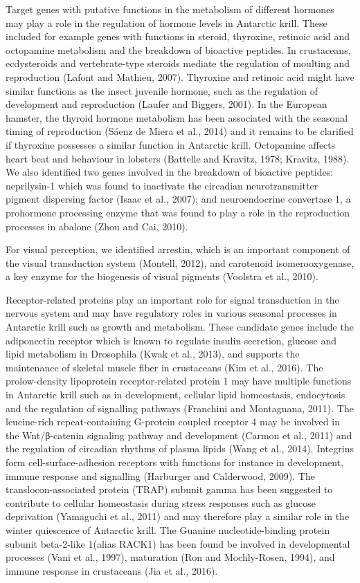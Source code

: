 Target genes with putative functions in the metabolism of different hormones may play a role in the regulation of hormone levels in Antarctic krill. These included for example genes with functions in steroid, thyroxine, retinoic acid and octopamine metabolism and the breakdown of bioactive peptides. In crustaceans, ecdysteroids and vertebrate-type steroids mediate the regulation of moulting and reproduction (Lafont and Mathieu, 2007). Thyroxine and retinoic acid might have similar functions as the insect juvenile hormone, such as the regulation of development and reproduction (Laufer and Biggers, 2001). In the European hamster, the thyroid hormone metabolism has been associated with the seasonal timing of reproduction (Sáenz de Miera et al., 2014) and it remains to be clarified if thyroxine possesses a similar function in Antarctic krill. Octopamine affects heart beat and behaviour in lobsters (Battelle and Kravitz, 1978; Kravitz, 1988). We also identified two genes involved in the breakdown of bioactive peptides: neprilysin-1 which was found to inactivate the circadian neurotransmitter pigment dispersing factor (Isaac et al., 2007); and neuroendocrine convertase 1, a prohormone processing enzyme that was found to play a role in the reproduction processes in abalone (Zhou and Cai, 2010).  

For visual perception, we identified arrestin, which is an important component of the visual transduction system (Montell, 2012), and carotenoid isomerooxygenase, a key enzyme for the biogenesis of visual pigments (Voolstra et al., 2010).

Receptor-related proteins play an important role for signal transduction in the nervous system and may have regulatory roles in various seasonal processes in Antarctic krill such as growth and metabolism. These candidate genes include the adiponectin receptor which is known to regulate insulin secretion, glucose and lipid metabolism in Drosophila (Kwak et al., 2013), and supports the maintenance of skeletal muscle fiber in crustaceans (Kim et al., 2016). The prolow-density lipoprotein receptor-related protein 1 may have multiple functions in Antarctic krill such as in development, cellular lipid homeostasis, endocytosis and the regulation of signalling pathways (Franchini and Montagnana, 2011). The leucine-rich repeat-containing G-protein coupled receptor 4 may be involved in the Wnt/β-catenin signaling pathway and development (Carmon et al., 2011) and the regulation of circadian rhythms of plasma lipids (Wang et al., 2014). Integrins form cell-surface-adhesion receptors with functions for instance in development, immune response and signalling (Harburger and Calderwood, 2009). The translocon-associated protein (TRAP) subunit gamma has been suggested to contribute to cellular homeostasis during stress responses such as glucose deprivation (Yamaguchi et al., 2011) and may therefore play a similar role in the winter quiescence of Antarctic krill. The Guanine nucleotide-binding protein subunit beta-2-like 1(alias RACK1) has been found be involved in developmental processes (Vani et al., 1997), maturation (Ron and Mochly-Rosen, 1994), and immune response in crustaceans (Jia et al., 2016).

